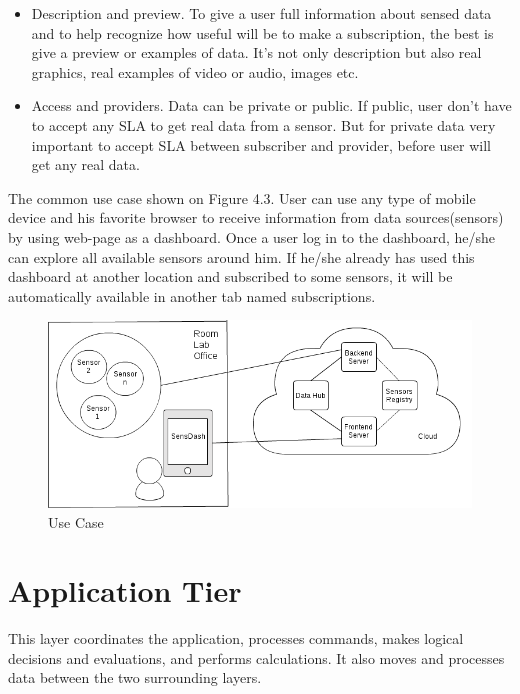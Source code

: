 \begin{itemize}
      \item Description and preview. To give a user full information about sensed data and to help recognize how useful will be to make a subscription, the best is give a preview or examples of data. It's not only description but also real graphics, real examples of video or audio, images etc.
      \item Access and providers. Data can be private or public. If public, user don't have to accept any SLA to get real data from a sensor. But for private data very important to accept SLA between subscriber and provider, before user will get any real data.
      \end{itemize}

    The common use case shown on Figure 4.3. User can use any type of mobile device and his favorite browser to receive information from data sources(sensors) by using web-page as a dashboard. Once a user log in to the dashboard, he/she can explore all available sensors around him. If he/she already has used this dashboard at another location and subscribed to some sensors, it will be automatically available in another tab named subscriptions. 

        \begin{figure}[!ht]
        \centering
        \includegraphics[scale=0.6]{images/User_Case.png}   
        \caption[Use Case]{Use Case}
        \label{img:structure}                           
        \end{figure}

\section{Application Tier}
  This layer coordinates the application, processes commands, makes logical decisions and evaluations, and performs calculations. It also moves and processes data between the two surrounding layers.

